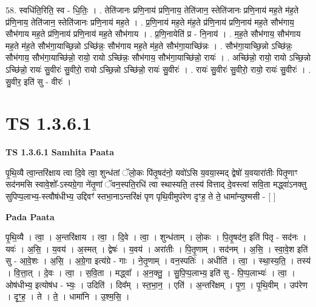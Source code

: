 \documentclass[17pt]{extarticle}
\begin{document}
58. स्वधि॑ति॒रिति॒ स्व - धि॒तिः॒ । . तेति॑जानः प्रणि॒नाय॑ प्रणि॒नाय॒ तेति॑जान॒ स्तेति॑जानः प्रणि॒नाय॑ मह॒ते म॑ह॒ते प्र॑णि॒नाय॒ तेति॑जान॒ स्तेति॑जानः प्रणि॒नाय॑ मह॒ते । . प्र॒णि॒नाय॑ मह॒ते म॑ह॒ते प्र॑णि॒नाय॑ प्रणि॒नाय॑ मह॒ते सौभ॑गाय॒ सौभ॑गाय मह॒ते प्र॑णि॒नाय॑ प्रणि॒नाय॑ मह॒ते सौभ॑गाय । . प्र॒णि॒नायेति॑ प्र - नि॒नाय॑ । . म॒ह॒ते सौभ॑गाय॒ सौभ॑गाय मह॒ते म॑ह॒ते सौभ॑गा॒याच्छि॒न्नो ऽच्छि॑न्नः॒ सौभ॑गाय मह॒ते म॑ह॒ते सौभ॑गा॒याच्छि॑न्नः । . सौभ॑गा॒याच्छि॒न्नो ऽच्छि॑न्नः॒ सौभ॑गाय॒ सौभ॑गा॒याच्छि॑न्नो॒ रायो॒ रायो ऽच्छि॑न्नः॒ सौभ॑गाय॒ सौभ॑गा॒याच्छि॑न्नो॒ रायः॑ । . अच्छि॑न्नो॒ रायो॒ रायो ऽच्छि॒न्नो ऽच्छि॑न्नो॒ रायः॑ सु॒वीरः॑ सु॒वीरो॒ रायो ऽच्छि॒न्नो ऽच्छि॑न्नो॒ रायः॑ सु॒वीरः॑ । . रायः॑ सु॒वीरः॑ सु॒वीरो॒ रायो॒ रायः॑ सु॒वीरः॑ । . सु॒वीर॒ इति॑ सु - वीरः॑ । \newline
\pagebreak
{}

\section{ TS 1.3.6.1 }

\textbf{TS 1.3.6.1 } \newline
\textbf{Samhita Paata} \newline

पृ॒थि॒व्यै त्वा॒न्तरि॑क्षाय त्वा दि॒वे त्वा॒ शुन्ध॑तां ॅलो॒कः पि॑तृ॒षद॑नो॒ यवो॑ऽसि य॒वया॒स्मद् द्वेषो॑ य॒वयारा॑तीः पितृ॒णाꣳ सद॑नमसि स्वावे॒शो᳚-ऽस्यग्रे॒गा ने॑तृ॒णां ॅवन॒स्पति॒रधि॑ त्वा स्थास्यति॒ तस्य॑ वित्ताद् दे॒वस्त्वा॑ सवि॒ता मद्ध्वा॑ऽनक्तु सुपिप्प॒लाभ्य॒-स्त्वौष॑धीभ्य॒ उद्दिवꣳ॑ स्तभा॒नाऽन्तरि॑क्षं पृण पृथि॒वीमुप॑रेण दृꣳह॒ ते ते॒ धामा᳚न्युश्मसी - [ ] \newline

\textbf{Pada Paata} \newline

पृ॒थि॒व्यै । त्वा॒ । अ॒न्तरि॑क्षाय । त्वा॒ । दि॒वे । त्वा॒ । शुन्ध॑ताम् । लो॒कः । पि॒तृ॒षद॑न॒ इति॑ पितृ - सद॑नः । यवः॑ । अ॒सि॒ । य॒वय॑ । अ॒स्मत् । द्वेषः॑ । य॒वय॑ । अरा॑तीः । पि॒तृ॒णाम् । सद॑नम् । अ॒सि॒ । स्वा॒वे॒श इति॑ सु - आ॒वे॒शः । अ॒सि॒ । अ॒ग्रे॒गा इत्य॑ग्रे - गाः । ने॒तृ॒णाम् । वन॒स्पतिः॑ । अधीति॑ । त्वा॒ । स्था॒स्य॒ति॒ । तस्य॑ । वि॒त्ता॒त् । दे॒वः । त्वा॒ । स॒वि॒ता । मद्ध्वा᳚ । अ॒न॒क्तु॒ । सु॒पि॒प्प॒लाभ्य॒ इति॑ सु - पि॒प्प॒लाभ्यः॑ । त्वा॒ । ओष॑धीभ्य॒ इत्योष॑ध - भ्यः॒ । उदिति॑ । दिव᳚म् । स्त॒भा॒न॒ । एति॑ । अ॒न्तरि॑क्षम् । पृ॒ण॒ । पृ॒थि॒वीम् । उप॑रेण । दृꣳ॒॒ह॒ । ते । ते॒ । धामा॑नि । उ॒श्म॒सि॒ ।  \newline
\end{document}
